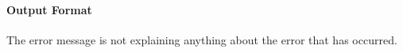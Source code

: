 


\paragraph{Output Format}
\begin{itemize}
		The error message
		is not explaining anything about the error that has occurred.
\end{itemize}

